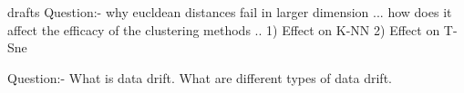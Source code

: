 drafts 
Question:- why eucldean distances fail in larger dimension ... how does it affect the efficacy of the clustering methods ..
1) Effect on K-NN 
2) Effect on T-Sne  


Question:- What is data drift. What are different types of data drift. 


